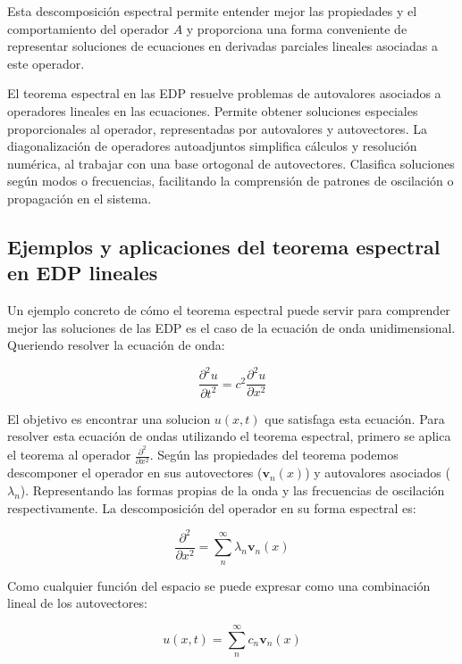 \documentclass{article}
\begin{document}
    Esta descomposición espectral permite entender mejor las propiedades y el comportamiento del operador $A$ y  proporciona una forma conveniente de representar soluciones de ecuaciones en derivadas parciales lineales asociadas a este operador.
 
   El teorema espectral en las EDP resuelve problemas de autovalores asociados a operadores lineales en las ecuaciones. Permite obtener soluciones especiales proporcionales al operador, representadas por autovalores y autovectores. La diagonalización de operadores autoadjuntos simplifica cálculos y resolución numérica, al trabajar con una base ortogonal de autovectores. Clasifica soluciones según modos o frecuencias, facilitando la comprensión de patrones de oscilación o propagación en el sistema.

    \subsection{Ejemplos y aplicaciones del teorema espectral en EDP lineales}

    Un ejemplo concreto de cómo el teorema espectral puede servir para comprender mejor las soluciones de las EDP es el caso de la ecuación de onda unidimensional. Queriendo resolver la ecuación de onda:

    \begin{equation}
    \frac{{\partial^2 u}}{{\partial t^2}} = c^2 \frac{{\partial^2 u}}{{\partial x^2}}
    \end{equation}

    El objetivo es encontrar una solucion $u(x,t)$ que satisfaga esta ecuación.
    Para resolver esta ecuación de ondas utilizando el teorema espectral, primero se aplica el teorema al operador $\frac{\partial^2 }{\partial x^2}$. 
    Según las propiedades del teorema podemos descomponer el operador en sus autovectores ($\mathbf{v}_n(x)$) y autovalores asociados ($\lambda_n$). Representando las formas propias de la onda y las frecuencias de oscilación respectivamente. La descomposición del operador en su forma espectral es:

    \begin{equation}
        \frac{{\partial^2 }}{{\partial x^2}} = \sum_{n}^{\infty} \lambda_n \mathbf{v}_n(x)
    \end{equation}
    
    Como cualquier función del espacio se puede expresar como una combinación lineal de los autovectores:

    \begin{equation}
        u(x, t) = \sum_{n}^{\infty} c_n \mathbf{v}_n(x)
    \end{equation} 
    
\end{document}
